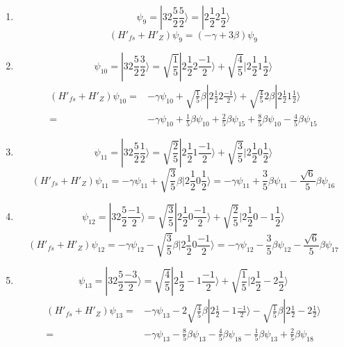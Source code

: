 \begin{enumerate}
$$    =-9\gamma\psi_8-\frac{\sqrt{2}}{3}\beta\psi_5
    -\frac{1}{3}\beta\psi_8
    $$
    \item 
    $$
    \psi_9 = |32\frac{5}{2}\frac{5}{2}\rangle
    =
    |2\frac{1}{2}2\frac{1}{2}\rangle
    $$
    $$
    (H'_{fs} + H'_Z)\psi_9 = 
    (-\gamma+3\beta)\psi_9
    $$
    \item 
    $$
    \psi_{10} = |32\frac{5}{2}\frac{3}{2}\rangle
    =
    \sqrt{\frac{1}{5}}|2\frac{1}{2}2\frac{-1}{2}\rangle
    +\sqrt{\frac{4}{5}}
    |2\frac{1}{2}1\frac{1}{2}\rangle
    $$
    \begin{align*}
    (H'_{fs} + H'_Z)\psi_{10} = &
    -\gamma\psi_{10}+
    \sqrt{\frac{1}{5}}\beta|2\frac{1}{2}2\frac{-1}{2}\rangle
    +\sqrt{\frac{4}{5}}2\beta
    |2\frac{1}{2}1\frac{1}{2}\rangle\\
    =&-\gamma\psi_{10}+
    \frac{1}{5}\beta\psi_{10}+\frac{2}{5}\beta\psi_{15} + 
    \frac{8}{5}\beta\psi_{10}
    -\frac{4}{5}\beta\psi_{15}
    \end{align*}
    
    \item 
    $$
    \psi_{11} = |32\frac{5}{2}\frac{1}{2}\rangle
    =
    \sqrt{\frac{2}{5}}|2\frac{1}{2}1\frac{-1}{2}\rangle
    +\sqrt{\frac{3}{5}}
    |2\frac{1}{2}0\frac{1}{2}\rangle
    $$
    $$
    (H'_{fs} + H'_Z)\psi_{11} = 
    -\gamma\psi_{11}
    +\sqrt{\frac{3}{5}}\beta
    |2\frac{1}{2}0\frac{1}{2}\rangle
    =-\gamma\psi_{11}+
    \frac{3}{5}\beta\psi_{11}-\frac{\sqrt{6}}{5}\beta\psi_{16}
    $$
    \item 
    $$
    \psi_{12} = |32\frac{5}{2}\frac{-1}{2}\rangle
    =
    \sqrt{\frac{3}{5}}|2\frac{1}{2}0\frac{-1}{2}\rangle
    +\sqrt{\frac{2}{5}}
    |2\frac{1}{2}0-1\frac{1}{2}\rangle
    $$
    $$
    (H'_{fs} + H'_Z)\psi_{12} = 
    -\gamma\psi_{12}
    -\sqrt{\frac{3}{5}}\beta
    |2\frac{1}{2}0\frac{-1}{2}\rangle
    =-\gamma\psi_{12}-\frac{3}{5}\beta\psi_{12}-\frac{\sqrt{6}}{5}\beta\psi_{17}
    $$
    \item 
    $$
    \psi_{13} = |32\frac{5}{2}\frac{-3}{2}\rangle
    =
    \sqrt{\frac{4}{5}}|2\frac{1}{2}-1\frac{-1}{2}\rangle
    +\sqrt{\frac{1}{5}}
    |2\frac{1}{2}-2\frac{1}{2}\rangle
    $$
    \begin{align*}
    (H'_{fs} + H'_Z)\psi_{13} = &
    -\gamma\psi_{13}-2
    \sqrt{\frac{4}{5}}\beta|2\frac{1}{2}-1\frac{-1}{2}\rangle
    -\sqrt{\frac{1}{5}}\beta
    |2\frac{1}{2}-2\frac{1}{2}\rangle\\
    = & -\gamma\psi_{13}-\frac{8}{5}\beta\psi_{13}-\frac{4}{5}\beta\psi_{18}
    -\frac{1}{5}\beta\psi_{13}+\frac{2}{5}\beta\psi_{18}
    \end{align*}
    

\end{enumerate}
